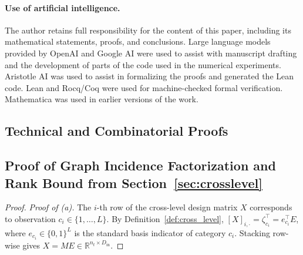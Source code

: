 \documentclass[default,sn-mathphys,Numbered]{sn-jnl}
\theoremstyle{thmstyleone}
\theoremstyle{thmstylethree}
\theoremstyle{thmstyletwo}
\newcommand{\inp}{\text{in}}
\begin{document}
\paragraph{Use of artificial intelligence.} The author retains full responsibility for the content of this paper, including its mathematical statements, proofs, and conclusions. Large language models provided by OpenAI and Google AI were used to assist with manuscript drafting and the development of parts of the code used in the numerical experiments. Aristotle AI was used to assist in formalizing the proofs and generated the Lean code. Lean and Rocq/Coq were used for machine-checked formal verification. Mathematica was used in earlier versions of the work.

\begin{appendices}

\section{Technical and Combinatorial Proofs}
\label{sec:appendix_proofs}

\subsection{Proof of Graph Incidence Factorization and Rank Bound from Section~\ref{sec:crosslevel} }
\label{subsec:proof_rank_bound}

\begin{proof}
\textit{Proof of (a).}
The $i$-th row of the cross-level design matrix $X$ corresponds to observation $c_i \in \{1, \dots, L\}$. By Definition~\ref{def:cross_level}, $[X]_{i, \cdot} = \zeta_{c_i}^\top = e_{c_i}^\top E$, where $e_{c_i} \in \{0, 1\}^L$ is the standard basis indicator of category $c_i$. Stacking row-wise gives $X = M E \in \mathbb{R}^{n_t \times D_{\inp}}$.


\end{proof}
\end{appendices}
\end{document}

